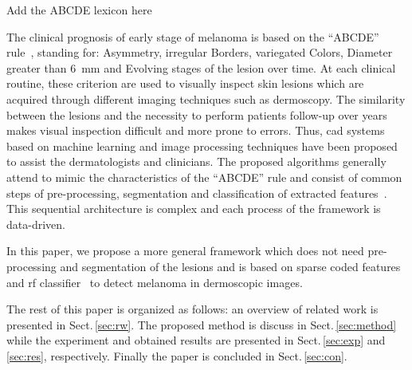 {\color{red}Add the ABCDE lexicon here}

The clinical prognosis of early stage of melanoma is based on the ``ABCDE'' rule~\cite{abbasi2004early}, standing for: Asymmetry, irregular Borders, variegated Colors, Diameter greater than \SI{6}{\milli \meter} and Evolving stages of the lesion over time.
At each clinical routine, these criterion are used to visually inspect skin lesions which are acquired through different imaging techniques such as dermoscopy.
The similarity between the lesions and the necessity to perform patients follow-up over years makes visual inspection difficult and more prone to errors.
Thus, \ac{cad} systems based on machine learning and image processing techniques have been proposed to assist the dermatologists and clinicians. 
The proposed algorithms generally attend to mimic the characteristics of the ``ABCDE'' rule and consist of common steps of pre-processing, segmentation and classification of extracted features~\cite{rastgoo2015automatic}.
This sequential architecture is complex and each process of the framework is data-driven. 

In this paper, we propose a more general framework which does not need pre-processing and segmentation of the lesions and is based on sparse coded features and \ac{rf} classifier~\cite{breiman2001random} to detect melanoma in dermoscopic images. 

The rest of this paper is organized as follows: an overview of related work is presented in Sect.\,\ref{sec:rw}.
The proposed method is discuss in Sect.\,\ref{sec:method} while the experiment and obtained results are presented in Sect.\,\ref{sec:exp} and\,\ref{sec:res}, respectively.
Finally the paper is concluded in Sect.\,\ref{sec:con}.




